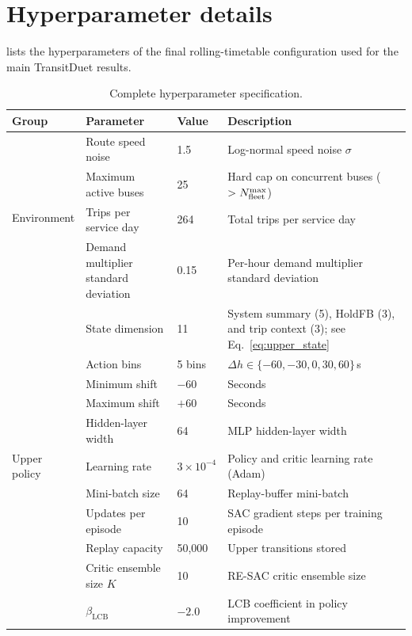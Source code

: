 \section{Hyperparameter details}
\label{app:hyperparams}

 lists the hyperparameters of the final rolling-timetable configuration used for the main TransitDuet results.

\begin{table}[H]
\centering
\caption{Complete hyperparameter specification.}
\label{tab:hyperparams_full}
\footnotesize
\setlength{\tabcolsep}{2pt}
\begin{tabular}{@{}p{}p{}p{}p{}@{}}
\toprule
Group & Parameter & Value & Description \\
\midrule
\multirow{4}{*}{Environment}
  & Route speed noise        & 1.5    & Log-normal speed noise $\sigma$ \\
  & Maximum active buses     & 25     & Hard cap on concurrent buses ($> N_{\mathrm{fleet}}^{\max}$) \\
  & Trips per service day & 264   & Total trips per service day \\
  & Demand multiplier standard deviation & 0.15 & Per-hour demand multiplier standard deviation \\
\midrule
\multirow{15}{*}{Upper policy}
  & State dimension    & 11             & System summary (5), HoldFB (3), and trip context (3); see Eq.~\ref{eq:upper_state} \\
  & Action bins  & 5 bins         & $\Delta h \in \{-60,-30,0,30,60\}$\,s \\
  & Minimum shift   & $-60$          & Seconds \\
  & Maximum shift  & $+60$          & Seconds \\
  & Hidden-layer width   & 64             & MLP hidden-layer width \\
  & Learning rate            & $3 \times 10^{-4}$ & Policy and critic learning rate (Adam) \\
  & Mini-batch size   & 64             & Replay-buffer mini-batch \\
  & Updates per episode & 10     & SAC gradient steps per training episode \\
  & Replay capacity      & 50{,}000 & Upper transitions stored \\
  & Critic ensemble size $K$    & 10     & RE-SAC critic ensemble size \\
  & $\beta_{\mathrm{LCB}}$         & $-2.0$ & LCB coefficient in policy improvement \\

\end{tabular}
\end{table}
